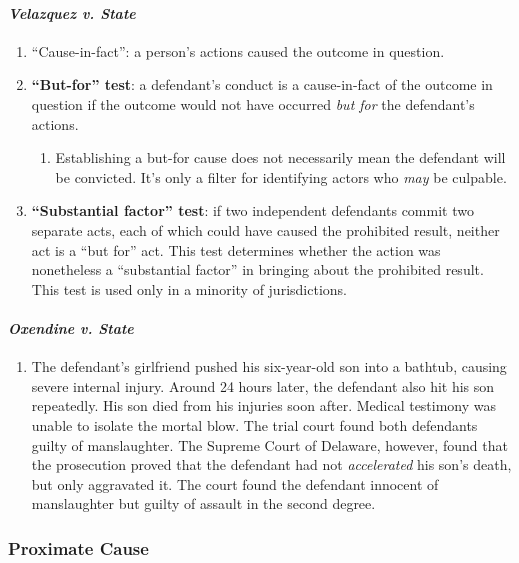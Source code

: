 \paragraph{\emph{Velazquez v. State}}

\begin{enumerate}
    \item ``Cause-in-fact'': a person's actions caused the outcome in question.
    \item \textbf{``But-for'' test}: a defendant's conduct is a cause-in-fact of the outcome in question if the outcome would not have occurred \emph{but for} the defendant's actions.
    \begin{enumerate}
        \item Establishing a but-for cause does not necessarily mean the defendant will be convicted. It's only a filter for identifying actors who \emph{may} be culpable.
    \end{enumerate}
    \item \textbf{``Substantial factor'' test}: if two independent defendants commit two separate acts, each of which could have caused the prohibited result, neither act is a ``but for'' act. This test determines whether the action was nonetheless a ``substantial factor'' in bringing about the prohibited result. This test is used only in a minority of jurisdictions.
\end{enumerate}

\paragraph{\emph{Oxendine v. State}}

\begin{enumerate}
    \item The defendant's girlfriend pushed his six-year-old son into a bathtub, causing severe internal injury. Around 24 hours later, the defendant also hit his son repeatedly. His son died from his injuries soon after. Medical testimony was unable to isolate the mortal blow. The trial court found both defendants guilty of manslaughter. The Supreme Court of Delaware, however, found that the prosecution proved that the defendant had not \emph{accelerated} his son's death, but only aggravated it. The court found the defendant innocent of manslaughter but guilty of assault in the second degree.
\end{enumerate}

\subsubsection{Proximate Cause} 

